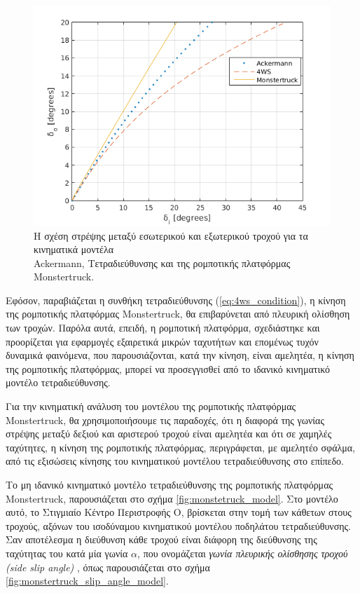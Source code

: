{\begin{figure}[!ht]
	\centering
	\includegraphics[width=0.6\linewidth]{Chapters/Chapter2/Figures/steer_angles_comparison.png}
	\caption{Η σχέση στρέψης μεταξύ εσωτερικού και εξωτερικού τροχού για τα κινηματικά μοντέλα \\Ackermann, Τετραδιεύθυνσης και της ρομποτικής πλατφόρμας Monstertruck.}
	\label{fig:steer_angles_comparison}
\end{figure}

Εφόσον, παραβιάζεται η {συνθήκη τετραδιεύθυνσης} (\ref{eq:4ws_condition}), η κίνηση της ρομποτικής πλατφόρμας {Monstertruck}, θα επιβαρύνεται από πλευρική ολίσθηση των τροχών. Παρόλα αυτά, επειδή, η ρομποτική πλατφόρμα, σχεδιάστηκε και προορίζεται για εφαρμογές εξαιρετικά μικρών ταχυτήτων και επομένως τυχόν δυναμικά φαινόμενα, που παρουσιάζονται, κατά την κίνηση, είναι αμελητέα, η κίνηση της ρομποτικής πλατφόρμας, μπορεί να προσεγγισθεί από το {ιδανικό κινηματικό μοντέλο τετραδιεύθυνσης}. 

\bigskip
Για την κινηματική ανάλυση του μοντέλου της ρομποτικής πλατφόρμας {Monstertruck}, θα χρησιμοποιήσουμε τις παραδοχές, ότι η διαφορά της γωνίας στρέψης μεταξύ δεξιού και αριστερού τροχού είναι αμελητέα και ότι σε χαμηλές ταχύτητες, η κίνηση της ρομποτικής πλατφόρμας, περιγράφεται, με αμελητέο σφάλμα, από τις εξισώσεις κίνησης του κινηματικού μοντέλου {τετραδιεύθυνσης} στο επίπεδο.

\bigskip
Το {μη ιδανικό κινηματικό μοντέλο τετραδιεύθυνσης} της ρομποτικής πλατφόρμας {Monstertruck}, παρουσιάζεται στο σχήμα \ref{fig:monstetruck_model}. Στο μοντέλο αυτό, το {Στιγμιαίο Κέντρο Περιστροφής Ο}, βρίσκεται στην τομή των κάθετων στους τροχούς, αξόνων του {ισοδύναμου κινηματικού μοντέλου ποδηλάτου τετραδιεύθυνσης}. Σαν αποτέλεσμα η διεύθυνση κάθε τροχού είναι διάφορη της διεύθυνσης της ταχύτητας του κατά μία γωνία $\alpha$, που ονομάζεται \textit{γωνία πλευρικής ολίσθησης τροχού (side slip angle)} \cite{4ws_kinematics}, όπως παρουσιάζεται στο σχήμα \ref{fig:monstertruck_slip_angle_model}.


}
